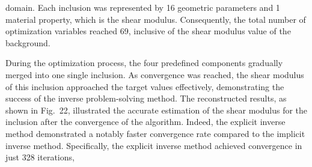 \documentclass[11pt]{article}
\begin{document}
\vspace{0.8em}

\noindent
domain. Each inclusion was represented by 16 geometric parameters
and 1 material property, which is the shear modulus. Consequently,
the total number of optimization variables reached 69, inclusive
of the shear modulus value of the background.

During the optimization process, the four predefined components
gradually merged into one single inclusion. As convergence was
reached, the shear modulus of this inclusion approached the
target values effectively, demonstrating the success of the
inverse problem-solving method. The reconstructed results, as
shown in Fig.~22, illustrated the accurate estimation of the
shear modulus for the inclusion after the convergence of the
algorithm. Indeed, the explicit inverse method demonstrated a
notably faster convergence rate compared to the implicit inverse
method. Specifically, the explicit inverse method achieved
convergence in just 328 iterations,

\vspace{0.8em}
\end{document}

